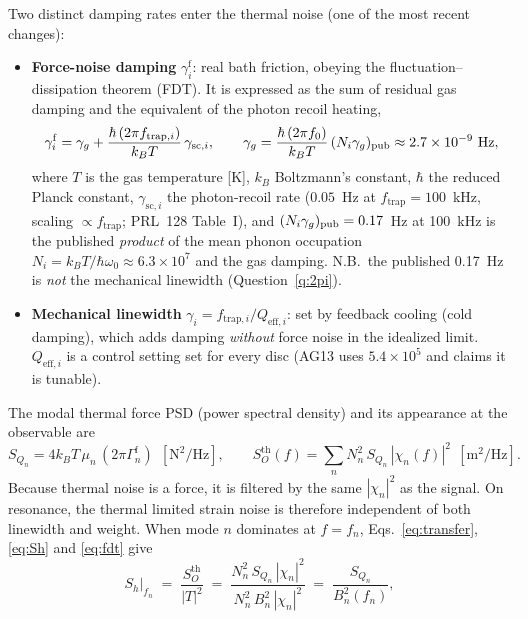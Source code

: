 \documentclass[11pt]{article}
\begin{document}
Two distinct damping rates enter the thermal noise 
(one of the most recent changes):
\begin{itemize}[noitemsep]
\item \textbf{Force-noise damping} $\gamma^{\mathrm{f}}_i$: real
  bath friction, obeying the fluctuation--dissipation theorem (FDT). It
  is expressed as the sum of 
  residual gas damping and the equivalent of the photon recoil heating,
  \begin{equation}
    \gamma^{\mathrm{f}}_i = \gamma_g
      + \frac{\hbar\,(2\pi f_{\mathrm{trap},i})}{k_B T}\,
        \gamma_{\mathrm{sc},i},
    \qquad
    \gamma_g = \frac{\hbar\,(2\pi f_0)}{k_B T}\,(N_i\gamma_g)_{\rm pub}
    \approx 2.7\times10^{-9}\ \mathrm{Hz},
    \label{eq:gforce}
  \end{equation}
  where $T$ is the gas temperature [K], $k_B$ Boltzmann's constant,
  $\hbar$ the reduced Planck constant, $\gamma_{\mathrm{sc},i}$ the
  photon-recoil rate ($0.05$~Hz at $f_{\mathrm{trap}} = 100$~kHz,
  scaling $\propto f_{\mathrm{trap}}$; PRL~128 Table~I), and
  $(N_i\gamma_g)_{\rm pub} = 0.17$~Hz at 100~kHz is the published
  \emph{product} of the mean phonon occupation $N_i = k_B
  T/\hbar\omega_0 \approx 6.3\times10^{7}$ and the gas damping.
  N.B.\ the published 0.17~Hz is \emph{not} the mechanical linewidth
  (Question~\ref{q:2pi}).
\item \textbf{Mechanical linewidth} $\gamma_i = f_{\mathrm{trap},i} /
  Q_{\mathrm{eff},i}$: set by feedback cooling (cold damping), which
  adds damping \emph{without} force noise in the idealized limit.
  $Q_{\mathrm{eff},i}$ is a control setting set for every disc (AG13 uses
  $5.4\times10^5$ and claims it is tunable).
\end{itemize}
The modal thermal force PSD (power spectral density) and its
appearance at the observable are
\begin{equation}
  S_{Q_n} = 4 k_B T\, \mu_n\, (2\pi\Gamma^{\mathrm{f}}_n)
  \ \ [\mathrm{N^2/Hz}],
  \qquad
  S^{\mathrm{th}}_O(f) = \sum_n N_n^2\, S_{Q_n}\, |\chi_n(f)|^2
  \ \ [\mathrm{m^2/Hz}].
  \label{eq:fdt}
\end{equation}
Because thermal noise is a force, it is filtered by the same
$|\chi_n|^2$ as the signal. On resonance, the thermal limited strain
noise is therefore independent of both linewidth and weight. 
When mode $n$
dominates at $f = f_n$, Eqs.~\eqref{eq:transfer}, \eqref{eq:Sh} and
\eqref{eq:fdt} give
\begin{equation}
  S_h\big|_{f_n} \;=\; \frac{S^{\mathrm{th}}_O}{|T|^2}
  \;=\; \frac{N_n^2\, S_{Q_n}\, |\chi_n|^2}
             {N_n^2\, B_n^2\, |\chi_n|^2}
  \;=\; \frac{S_{Q_n}}{B_n^2(f_n)},
  \label{eq:floorproof}
\end{equation}
\end{document}
